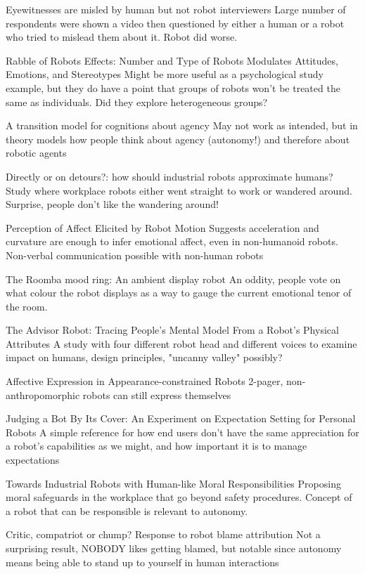 \documentclass{sfuthesis}
\begin{document}
Eyewitnesses are misled by human but not robot interviewers	Large number of respondents were shown a video then questioned by either a human or a robot who tried to mislead them about it. Robot did worse.	

Rabble of Robots Effects: Number and Type of Robots Modulates Attitudes, Emotions, and Stereotypes	Might be more useful as a psychological study example, but they do have a point that groups of robots won't be treated the same as individuals. Did they explore heterogeneous groups?	

A transition model for cognitions about agency	May not work as intended, but in theory models how people think about agency (autonomy!) and therefore about robotic agents	

Directly or on detours?: how should industrial robots approximate humans?	Study where workplace robots either went straight to work or wandered around. Surprise, people don't like the wandering around!	

Perception of Affect Elicited by Robot Motion	Suggests acceleration and curvature are enough to infer emotional affect, even in non-humanoid robots. Non-verbal communication possible with non-human robots	

The Roomba mood ring: An ambient display robot	An oddity, people vote on what colour the robot displays as a way to gauge the current emotional tenor of the room.	

The Advisor Robot: Tracing People's Mental Model From a Robot's Physical Attributes	A study with four different robot head and different voices to examine impact on humans, design principles, "uncanny valley" possibly?	

Affective Expression in Appearance-constrained Robots	2-pager, non-anthropomorphic robots can still express themselves	

Judging a Bot By Its Cover: An Experiment on Expectation Setting for Personal Robots	A simple reference for how end users don't have the same appreciation for a robot's capabilities as we might, and how important it is to manage expectations	

Towards Industrial Robots with Human-like Moral Responsibilities	Proposing moral safeguards in the workplace that go beyond safety procedures. Concept of a robot that can be responsible is relevant to autonomy.	

Critic, compatriot or chump? Response to robot blame attribution	Not a surprising result, NOBODY likes getting blamed, but notable since autonomy means being able to stand up to yourself in human interactions	
\end{document}
